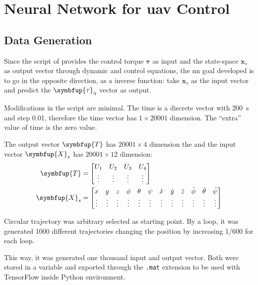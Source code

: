 \section{Neural Network for \gls*{uav} Control}

\subsection{Data Generation}

Since the script of \citet{geronel2023} provides the control torque \(\symbf{\tau}\) as input and the state-space \(\symbf{x}_s\) as output vector through dynamic and control equations, the \gls*{nn} goal developed is to go in the opposite direction, as a inverse function: take \(\symbf{x}_s\) as the input vector and predict the \(\symbfup{\tau}_{\eta}\) vector as output.

Modifications in the script are minimal.
The time is a discrete vector with \SI{200}{s} and step 0.01, therefore the time vector has \(1\times 20001\) dimension.
The ``extra'' value of time is the zero value.

The output vector \(\symbfup{T}\) has \(20001\times 4\) dimension the and the input vector \(\symbfup{X}_s\) has  \(20001\times 12\) dimension:
%
\begin{align}
    \symbfup{T} &= \begin{bmatrix}
        U_1 & U_2 & U_3 & U_4 \\
        \vdots       & \vdots       & \vdots       & \vdots  \\
    \end{bmatrix} 
    \label{eq:tau_input} \\
    \setcounter{MaxMatrixCols}{13}
    \symbfup{X}_s &=
    \begin{bmatrix}
        x&y&z&\phi&\theta&\psi&\dot{x}&\dot{y}&\dot{z}&\dot{\phi}&\dot{\theta}&\dot{\psi} \\
        \vdots & \vdots & \vdots & \vdots & \vdots & \vdots & \vdots & \vdots & \vdots & \vdots & \vdots & \vdots 
    \end{bmatrix}
    \label{eq:xs_output}
\end{align}

Circular trajectory was arbitrary selected as starting point.
By a loop, it was generated 1000 different trajectories changing the position  by increasing 1/600  for each loop.

This way, it was generated one thousand input and output vector.
Both were stored in a \matlab variable and exported through the \texttt{.mat} extension to be used with TensorFlow inside Python environment.

